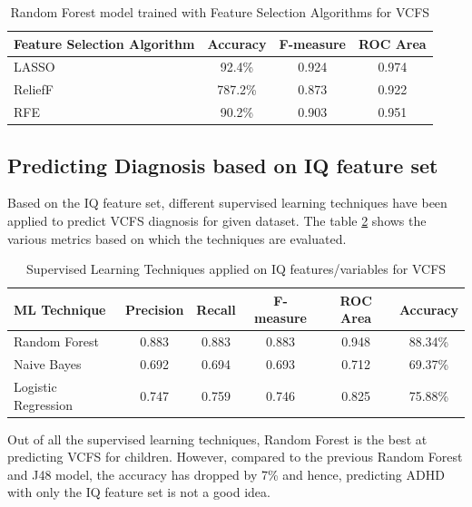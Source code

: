 \begin{table}[h]
\begin{center}
\begin{tabular}{|l|c|c|c|}
\hline
\textbf{Feature Selection Algorithm}&	\textbf{Accuracy}&	\textbf{F-measure}&	\textbf{ROC Area}\\
\hline \hline
LASSO	&92.4\%&	0.924&	0.974\\
\hline
ReliefF &787.2\%&	0.873&	0.922\\
\hline
RFE &	90.2\%	&0.903&	0.951\\
\hline
\end{tabular}
\end{center}
\caption{ Random Forest model trained with Feature Selection Algorithms for VCFS}
\label{table:614}
\end{table}

\subsection{Predicting Diagnosis based on IQ feature set}
Based on the IQ feature set, different supervised learning techniques have been applied to predict VCFS diagnosis for given dataset. The table \ref{table:615} shows the various metrics based on which the techniques are evaluated.
\begin{table}[h]
\begin{center}
\begin{tabular}{|l|c|c|c|c|c|}
\hline
\textbf{ML Technique}&	\textbf{Precision}&	\textbf{Recall}&	\textbf{F-measure}&	\textbf{ROC Area}&	\textbf{Accuracy}\\
\hline \hline
Random Forest&0.883&	0.883&	0.883&	0.948&	88.34\%\\
\hline
Naive Bayes&0.692&	0.694&	0.693&	0.712&	69.37\%\\
\hline
Logistic Regression	&0.747&	0.759&	0.746&	0.825&	75.88\%\\
\hline
\end{tabular}
\end{center}
\caption{Supervised Learning Techniques applied on IQ features/variables for VCFS}
\label{table:615}
\end{table}

Out of all the supervised learning techniques, Random Forest is the best at predicting VCFS for children. However, compared to the previous Random Forest and J48 model, the accuracy has dropped by 7\% and hence, predicting ADHD with only the IQ feature set is not a good idea.

